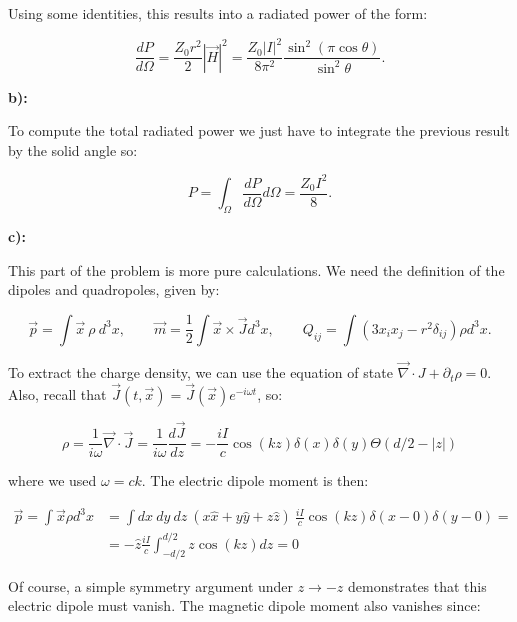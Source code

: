 Using some identities, this results into a radiated power of the form:

\begin{equation}
	\frac{d P}{d \Omega}=\frac{Z_{0} r^{2}}{2}|\vec{H}|^{2}=\frac{Z_{0}|I|^{2}}{8 \pi^{2}} \frac{\sin ^{2}(\pi \cos \theta)}{\sin ^{2} \theta}.
\end{equation}

\textbf{b):}

To compute the total radiated power we just have to integrate the previous result by the solid angle so:

\begin{equation}
	P = \int_{\Omega} \frac{dP}{d \Omega} d\Omega = \frac{Z_{0}I^{2}}{8}.
\end{equation}

\textbf{c):}

This part of the problem is more pure calculations. We need the definition of the dipoles and quadropoles, given by:

\begin{equation}
	\vec{p}=\int \vec{x} \: \rho\:  d^{3} x, \quad \quad \vec{m}=\frac{1}{2} \int \vec{x} \times \vec{J} d^{3} x, \quad \quad  
	Q_{i j}=\int\left(3 x_{i} x_{j}-r^{2} \delta_{i j}\right) \rho d^{3} x.
\end{equation}

To extract the charge density, we can use the equation of state $\vec{\nabla}\cdot J + \partial_{t} \rho =0$. Also, recall that $\vec{J}(t,\vec{x}) = \vec{J}(\vec{x}) e^{-i\omega t}$, so:

\begin{equation}
	\rho=\frac{1}{i \omega} \vec{\nabla} \cdot \vec{J}=\frac{1}{i \omega} \frac{d \vec{J}}{d z}=-\frac{i I}{c} \cos (k z) \delta(x) \delta(y) \Theta(d / 2-|z|)
\end{equation}

where we used $\omega=c k$. The electric dipole moment is then:

\begin{equation}
	\begin{split}
		\vec{p}=\int \vec{x} \rho d^{3} x&= \int dx \:dy \:dz \:(x \hat{x} + y \hat{y} + z \hat{z}) \:\frac{i I}{c} \cos (k z) \delta(x-0) \delta(y-0)=\\
		&=  -\hat{z} \frac{i I}{c} \int_{-d / 2}^{d / 2} z \cos (k z) d z=0
	\end{split}
\end{equation}

Of course, a simple symmetry argument under $z \rightarrow-z$ demonstrates that this electric dipole must vanish. The magnetic dipole moment also vanishes since:

